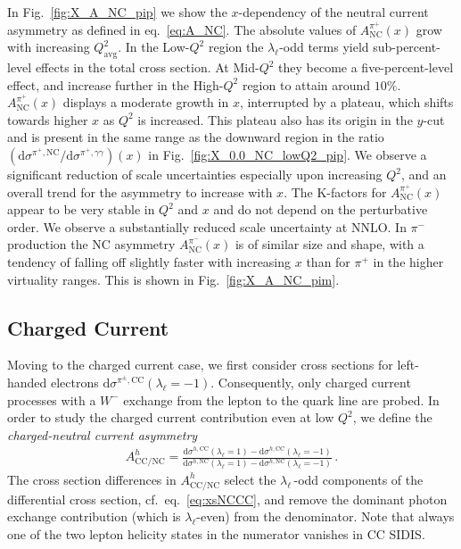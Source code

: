 \documentclass[11pt,a4paper]{article}
\newcommand{\dd}{\mathrm{d}}
\newcommand{\NC}{\mathrm{NC}}
\newcommand{\CC}{\mathrm{CC}}
\begin{document}
In Fig.~\ref{fig:X_A_NC_pip} we show the $x$-dependency of the neutral current asymmetry as defined in eq.~\eqref{eq:A_NC}.
The absolute values of $A^{\pi^+}_\NC(x)$ grow with increasing $Q^2_\mathrm{avg}$.
In the Low-$Q^2$ region the $\lambda_\ell$-odd terms yield sub-percent-level effects in the total cross section.
At Mid-$Q^2$ they become a five-percent-level effect, and increase further in the High-$Q^2$ region to attain around $10\%$.
%
$A^{\pi^+}_\NC(x)$ displays a moderate growth in $x$, interrupted by a plateau, which shifts towards higher $x$ as
$Q^2$
is increased.
This plateau also has its origin in the $y$-cut and is present in the same range as the downward region in the ratio $(\dd \sigma^{\pi^+,\NC}/\dd \sigma^{\pi^+,\gamma\gamma})(x)$ in Fig.~\ref{fig:X_0.0_NC_lowQ2_pip}.
%
We observe a significant reduction of scale uncertainties especially upon increasing $Q^2$, and an overall trend for the asymmetry to increase with $x$.
The K-factors for $A^{\pi^+}_\NC(x)$ appear to be very stable in $Q^2$ and $x$ and do not depend on the perturbative order. We observe a substantially  reduced scale uncertainty at NNLO.
%
In $\pi^-$ production the NC asymmetry $A_\NC^{\pi^-}(x)$ is of similar size and shape, with a tendency of falling off slightly faster with increasing $x$ than for $\pi^+$ in the higher virtuality ranges.
This is shown in Fig.~\ref{fig:X_A_NC_pim}.


\subsection{Charged Current}

Moving to the charged current case, we first consider cross sections for left-handed electrons $\dd\sigma^{\pi^{\pm},\CC} (\lambda_{\ell}=-1)$.
Consequently, only charged current processes with a $W^-$ exchange from the lepton to the quark line are probed.
%
In order to study the charged current contribution even at low $Q^2$,
we define the \emph{charged-neutral current asymmetry}
\begin{align}\label{eq:A_CCNC}
A^h_\mathrm{CC/NC} = \frac{\dd \sigma^{h,\CC} (\lambda_{\ell}=1) - \dd\sigma^{h,\CC} (\lambda_{\ell}=-1)}{\dd \sigma^{h,\NC} (\lambda_{\ell}=1) - \dd \sigma^{h,\NC} (\lambda_{\ell}=-1)} \, .
\end{align}
The cross section differences in $A^h_\mathrm{CC/NC}$ select the $\lambda_{\ell}\,$-odd components of the differential cross section,
cf.\ eq.~\eqref{eq:xsNCCC}, and remove the dominant photon exchange contribution (which is $\lambda_{\ell}$-even) from the denominator.
Note that always one of the two lepton helicity states in the numerator vanishes in $\CC$ SIDIS.
\end{document}

